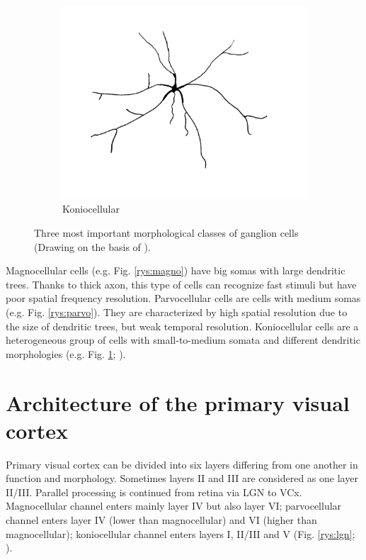 \documentclass{pracalicmgr}
\begin{document}
\begin{figure}[H]
\begin{subfigure}{.33\textwidth}
   		\centering
   		\includegraphics[width=1\linewidth]{cell_K2.png}
   		\caption{Koniocellular}
   		\label{rys:konio}
   	\end{subfigure}
   	\caption{Three most important morphological classes of ganglion cells  (Drawing on the basis of \cite{parallel}).}
   	\label{rys:ganglio}
   \end{figure}
   Magnocellular cells (e.g. Fig. \ref{rys:magno}) have big somas with large dendritic trees. Thanks to thick axon, this type of cells can recognize fast stimuli but have poor spatial frequency resolution. Parvocellular cells are cells with medium somas (e.g. Fig. \ref{rys:parvo}). They are characterized by high spatial resolution due to the size of dendritic trees, but weak temporal resolution. Koniocellular cells are a heterogeneous group of cells with small-to-medium somata and different dendritic morphologies (e.g. Fig. \ref{rys:konio}; \cite{parallel, viola2}). 
   
   
   \section{Architecture of the primary visual cortex}
   Primary visual cortex can be divided into six layers differing from one another in function and morphology. Sometimes layers II and III are considered as one layer II/III. Parallel processing is continued from retina via LGN to VCx. Magnocellular channel enters mainly layer IV but also layer VI; parvocellular channel enters layer IV (lower than magnocellular) and VI (higher than magnocellular); koniocellular channel enters layers I, II/III and V (Fig. \ref{rys:lgn}; \cite{parallel}).
   
\end{document}
